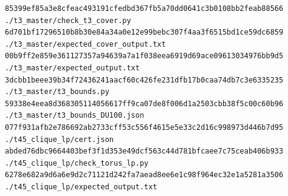 \documentclass[11pt]{article}
\theoremstyle{definition}
\theoremstyle{remark}
\begin{document}
\begin{Verbatim}[fontsize=\scriptsize]
85399ef85a3e8cfeac493191cfedbd367fb5a70dd0641c3b0108bb2feab88566  ./t3_master/check_t3_cover.py
6d701bf17296510b8b30e84a34a0e12e99bebc307f4aa3f6515bd1ce59dc6859  ./t3_master/expected_cover_output.txt
00b9ff2e859e361127357a94639a7a1f038eea6919d69ace09613034976bb9d5  ./t3_master/expected_output.txt
3dcbb1beee39b34f72436241aacf60c426fe231dfb17b0caa74db7c3e6335235  ./t3_master/t3_bounds.py
59338e4eea8d368305114056617ff9ca07de8f006d1a2503cbb38f5c00c60b96  ./t3_master/t3_bounds_DU100.json
077f931afb2e786692ab2733cff53c556f4615e5e33c2d16c998973d446b7d95  ./t45_clique_lp/cert.json
abded76dbc9664403bef3f1d353e49dcf563c44d781bfcaee7c75ceab406b933  ./t45_clique_lp/check_torus_lp.py
6278e682a9d6a6e9d2c71121d242fa7aead8ee6e1c98f964ec32e1a5281a3506  ./t45_clique_lp/expected_output.txt
\end{Verbatim}
\end{document}

